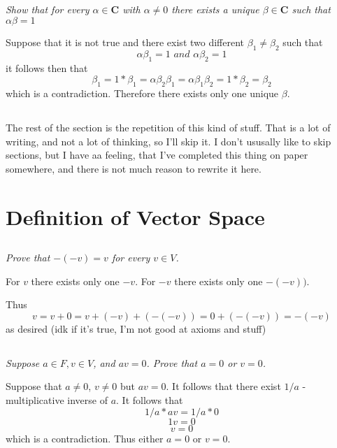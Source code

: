 \documentclass[10pt,oneside,titlepage]{book}
\begin{document}
\subsection{}
\textit{Show that for every $\alpha \in \textbf{C}$ with $\alpha \neq 0$
  there exists a unique $\beta \in \textbf{C}$ such that $\alpha \beta = 1$}

Suppose that it is not true and there exist two different
$\beta_1 \neq \beta_2$ such that
$$\alpha \beta_1 = 1 \textit{ and } \alpha \beta_2 = 1$$
it follows then that 
$$\beta_1 = 1 *  \beta_1 = \alpha \beta_2 \beta_1  =
\alpha \beta_1 \beta_2 = 1 * \beta_2 = \beta_2$$
which is a contradiction. Therefore there exists only one unique $\beta$.

\subsection{}
The rest of the section is the repetition of this kind of stuff.
That is a lot of writing, and not a lot of thinking, so I'll skip it.
I don't ususally like to skip sections, but I have  aa feeling, that I've
completed this thing on paper somewhere, and there is not much reason to
rewrite it here.

\section{Definition of Vector Space}

\subsection{}
\textit{Prove that $-(-v)= v$ for every $v \in V$.}

For $v$ there exists only one $-v$. For $-v$ there exists only one $-(-v))$.

Thus
$$v = v + 0 = v + (-v) + (-(-v)) = 0 + (-(-v)) = -(-v)$$
as desired (idk if it's true, I'm not good at axioms and stuff)

\subsection{}
\textit{Suppose $a \in F, v \in V$, and $av = 0$. Prove that
  $a = 0$ or $v = 0$.}

Suppose that $a \neq 0$, $v \neq 0$ but $av = 0$. It follows that there
exist $1/a$ - multiplicative inverse of $a$. It follows that
$$1/a * av = 1/a * 0$$
$$1v = 0$$
$$v = 0$$
which is a contradiction. Thus either $a = 0$ or $v = 0$.
\end{document}
